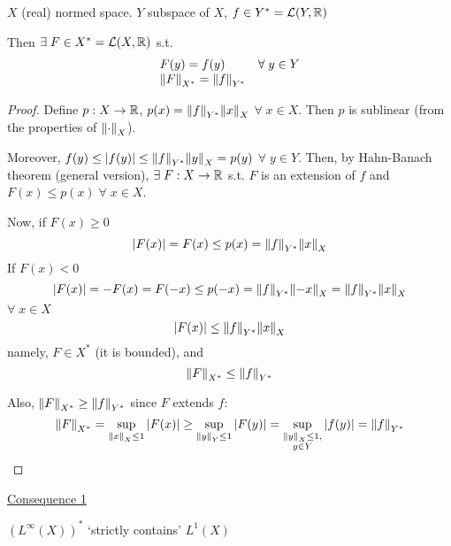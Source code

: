\begin{theorem}
    \(X\) (real) normed space. \(Y\) subspace of \(X\), \(f \in Y^* = \mathcal{L}(Y, \mathbb{R})\)

    Then \(\exists \; F \in X^* = \mathcal{L}(X, \mathbb{R})\) s.t. 
    \[
        \begin{array}{lr}
            
            F(y) = f(y) & \forall \; y \in Y \\

            \norm{F}_{X^*} = \norm{f}_{Y^*}   & \\
        \end{array}
    \]
\end{theorem}
\begin{proof}
    Define \(p:X \to \mathbb{R}\), \(p(x) = \norm{f}_{Y^*} \norm{x}_X\) \(\forall \; x \in X\). Then \(p\) is sublinear (from the properties of \(\norm{\cdot}_X\)).

    Moreover, \(f(y) \leq \abs{f(y)} \leq \norm{f}_{Y^*}\norm{y}_X = p(y)\) \(\forall \; y \in Y\). Then, by Hahn-Banach theorem (general version), \(\exists \; F : X \to \mathbb{R}\) s.t. \(F\) is an extension of \(f\) and \(F(x) \leq p(x) \; \forall \; x \in X\).

    Now, if \(F(x) \geq 0\)
    \[
        \abs{F(x)} = F(x) \leq p(x) = \norm{f}_{Y^*}\norm{x}_X
    \]
    If \(F(x) < 0\)
    \[
        \abs{F(x)} = -F(x) = F(-x) \leq p(-x) = \norm{f}_{Y^*}\norm{-x}_X = \norm{f}_{Y^*}\norm{x}_X
    \]
    \(\forall \; x \in X\)
    \[
        \abs{F(x)} \leq \norm{f}_{Y^*}\norm{x}_X
    \]
    namely, \(F \in X^*\) (it is bounded), and 
    \[
        \norm{F}_{X^*} \leq \norm{f}_{Y^*}
    \]

    Also, \(\norm{F}_{X^*} \geq \norm{f}_{Y^*}\) since \(F\) extends \(f\):
    \[
        \norm{F}_{X^*} = \sup_{\norm{x}_X \leq 1} \abs{F(x)} \geq \sup_{\norm{y}_Y \leq 1}\abs{F(y)} 
        = \sup_{\substack{\norm{y}_X \leq 1, \\ y \in Y}} \abs{f(y)} = \norm{f}_{Y^*}
    \]
\end{proof}
\noindent\underline{Consequence 1}
\begin{theorem}
    \((L^\infty (X))^*\) `strictly contains' \(L^1(X)\)
\end{theorem}

